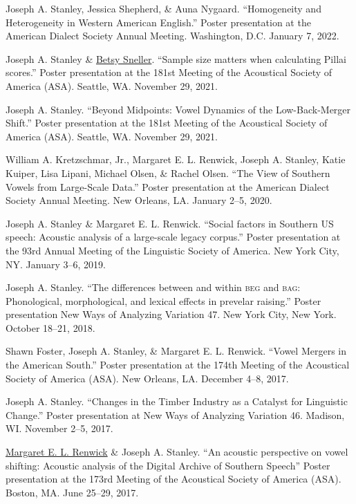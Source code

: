 \documentclass[
]{article}
\begin{document}
{Joseph A. Stanley}, {Jessica Shepherd}, \& {Auna Nygaard}.
``Homogeneity and Heterogeneity in Western American English.'' Poster
presentation at the American Dialect Society Annual Meeting. Washington,
D.C. January 7, 2022.

{Joseph A. Stanley} \& \href{https://betsysneller.github.io}{Betsy
Sneller}. ``Sample size matters when calculating Pillai scores.'' Poster
presentation at the 181st Meeting of the Acoustical Society of America
(ASA). Seattle, WA. November 29, 2021.

{Joseph A. Stanley}. ``Beyond Midpoints: Vowel Dynamics of the
Low-Back-Merger Shift.'' Poster presentation at the 181st Meeting of the
Acoustical Society of America (ASA). Seattle, WA. November 29, 2021.

William A. Kretzschmar, Jr., Margaret E. L. Renwick, {Joseph A.
Stanley}, Katie Kuiper, Lisa Lipani, Michael Olsen, \& Rachel Olsen.
``The View of Southern Vowels from Large-Scale Data.'' Poster
presentation at the American Dialect Society Annual Meeting. New
Orleans, LA. January 2--5, 2020.

{Joseph A. Stanley} \& Margaret E. L. Renwick. ``Social factors in
Southern US speech: Acoustic analysis of a large-scale legacy corpus.''
Poster presentation at the 93rd Annual Meeting of the Linguistic Society
of America. New York City, NY. January 3--6, 2019.

{Joseph A. Stanley}. ``The differences between and within \textsc{beg}
and \textsc{bag}: Phonological, morphological, and lexical effects in
prevelar raising.'' Poster presentation New Ways of Analyzing Variation
47. New York City, New York. October 18--21, 2018.

{Shawn Foster}, {Joseph A. Stanley}, \& Margaret E. L. Renwick. ``Vowel
Mergers in the American South.'' Poster presentation at the 174th
Meeting of the Acoustical Society of America (ASA). New Orleans, LA.
December 4--8, 2017.

{Joseph A. Stanley}. ``Changes in the Timber Industry as a Catalyst for
Linguistic Change.'' Poster presentation at New Ways of Analyzing
Variation 46. Madison, WI. November 2--5, 2017.

\href{http://faculty.franklin.uga.edu/mrenwick/}{Margaret E. L. Renwick}
\& {Joseph A. Stanley}. ``An acoustic perspective on vowel shifting:
Acoustic analysis of the Digital Archive of Southern Speech'' Poster
presentation at the 173rd Meeting of the Acoustical Society of America
(ASA). Boston, MA. June 25--29, 2017.
\end{document}
